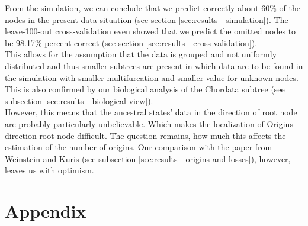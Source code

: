     From the simulation, we can conclude that we predict correctly about 60\% of the nodes in the 
      present data situation (see section \ref{sec:results - simulation}).
    The leave-100-out cross-validation even showed that we predict the omitted nodes to be 98.17\%  
      percent correct (see section \ref{sec:results - cross-validation}). \\
    This allows for the assumption that the data is grouped and not uniformly distributed and thus 
      smaller subtrees are present in which data are to be found in the simulation with smaller 
      multifurcation and smaller value for unknown nodes. This is also confirmed by our biological 
      analysis of the Chordata subtree (see subsection \ref{sec:results - biological view}). \\
    However, this means that the ancestral states' data in the direction of root node are probably 
      particularly unbelievable. Which makes the localization of Origins direction root node 
      difficult. The question remains, how much this affects the estimation of the number of origins. 
      Our comparison with the paper from Weinstein and Kuris \cite{Weinstein2016} (see subsection 
      \ref{sec:results - origins and losses}), however, leaves us with optimism.



\chapter{Appendix}
